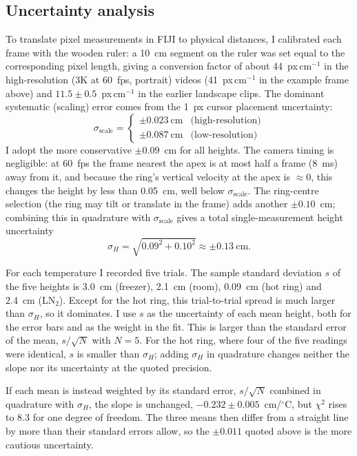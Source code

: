 \documentclass[11pt]{article}
\begin{document}
\subsection*{Uncertainty analysis}

To translate pixel measurements in FIJI to physical distances, I calibrated each frame with the
wooden ruler: a 10~cm segment on the ruler was set equal to the corresponding pixel length, giving a
conversion factor of about 44~px\,cm$^{-1}$ in the high-resolution (3K at 60~fps, portrait) videos
(41~px\,cm$^{-1}$ in the example frame above) and $11.5 \pm 0.5$~px\,cm$^{-1}$ in the earlier
landscape clips. The dominant systematic (scaling) error comes from the 1~px cursor placement
uncertainty:
\[
\sigma_\mathrm{scale} =
\begin{cases}
\pm 0.023~\mathrm{cm} & \text{(high-resolution)}\\
\pm 0.087~\mathrm{cm} & \text{(low-resolution)}
\end{cases}
\]
I adopt the more conservative $\pm 0.09$~cm for all heights. The camera timing is negligible: at
60~fps the frame nearest the apex is at most half a frame (8~ms) away from it, and because the
ring's vertical velocity at the apex is $\approx 0$, this changes the height by less than
0.05~cm, well below $\sigma_\mathrm{scale}$. The ring-centre selection (the ring may tilt or
translate in the frame) adds another $\pm 0.10$~cm; combining this in quadrature with
$\sigma_\mathrm{scale}$ gives a total single-measurement height uncertainty
\[
\sigma_H = \sqrt{0.09^2 + 0.10^2} \approx \pm 0.13~\mathrm{cm}.
\]

For each temperature I recorded five trials. The sample standard deviation $s$ of the five heights
is 3.0~cm (freezer), 2.1~cm (room), 0.09~cm (hot ring) and 2.4~cm (LN$_2$). Except for the hot
ring, this trial-to-trial spread is much larger than $\sigma_H$, so it dominates. I use $s$ as the
uncertainty of each mean height, both for the error bars and as the weight in the fit. This is
larger than the standard error of the mean, $s/\sqrt{N}$ with $N = 5$. For the hot ring, where four
of the five readings were identical, $s$ is smaller than $\sigma_H$; adding $\sigma_H$ in
quadrature changes neither the slope nor its uncertainty at the quoted precision.

If each mean is instead weighted by its standard error, $s/\sqrt{N}$ combined in quadrature with
$\sigma_H$, the slope is unchanged, $-0.232 \pm 0.005$~cm/$^{\circ}$C, but $\chi^2$ rises to 8.3
for one degree of freedom. The three means then differ from a straight line by more than their
standard errors allow, so the $\pm 0.011$ quoted above is the more cautious uncertainty.
\end{document}
